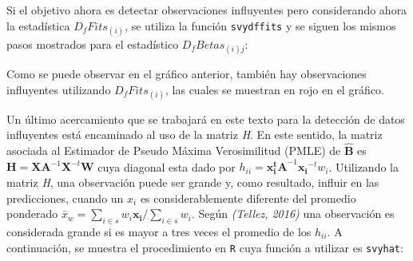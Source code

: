 \documentclass[
  12pt,
]{book}
\newenvironment{Shaded}{\begin{snugshade}}{\end{snugshade}}
\newcommand{\AttributeTok}[1]{\textcolor[rgb]{0.77,0.63,0.00}{#1}}
\newcommand{\DecValTok}[1]{\textcolor[rgb]{0.00,0.00,0.81}{#1}}
\newcommand{\FunctionTok}[1]{\textcolor[rgb]{0.00,0.00,0.00}{#1}}
\newcommand{\NormalTok}[1]{#1}
\newcommand{\OtherTok}[1]{\textcolor[rgb]{0.56,0.35,0.01}{#1}}
\newcommand{\SpecialCharTok}[1]{\textcolor[rgb]{0.00,0.00,0.00}{#1}}
\newcommand{\StringTok}[1]{\textcolor[rgb]{0.31,0.60,0.02}{#1}}
\begin{document}
Si el objetivo ahora es detectar observaciones influyentes pero considerando ahora la estadística \(D_{f}Fits_{\left(i\right)}\), se utiliza la función \texttt{svydffits} y se siguen los mismos pasos mostrados para el estadístico \(D_{f}Betas_{\left(i\right)j}\):

\begin{Shaded}
\end{Shaded}

Como se puede observar en el gráfico anterior, también hay observaciones influyentes utilizando \(D_{f}Fits_{\left(i\right)}\), las cuales se muestran en rojo en el gráfico.

Un último acercamiento que se trabajará en este texto para la detección de datos influyentes está encaminado al uso de la matriz \emph{H}. En este sentido, la matriz asociada al Estimador de Pseudo Máxima Verosimilitud (PMLE) de \(\hat{\boldsymbol{B}}\) es \(\boldsymbol{H}=\boldsymbol{XA}^{-1}\boldsymbol{X}^{-t}\boldsymbol{W}\) cuya diagonal esta dado por \(h_{ii} = \boldsymbol{x_{i}^tA}^{-1}\boldsymbol{x_{i}}^{-t}w_{i}\). Utilizando la matriz \emph{H}, una observación puede ser grande y, como resultado, influir en las predicciones, cuando un \(x_i\) es considerablemente diferente del promedio ponderado \(\bar{x}_w=\sum_{i\in s}w_{i}\boldsymbol{x_{i}}\big/\sum_{i\in s}w_i\). Según \emph{(Tellez, 2016)} una observación es considerada grande si es mayor a tres veces el promedio de los \(h_{ii}\). A continuación, se muestra el procedimiento en \texttt{R} cuya función a utilizar es \texttt{svyhat}:
\end{document}
